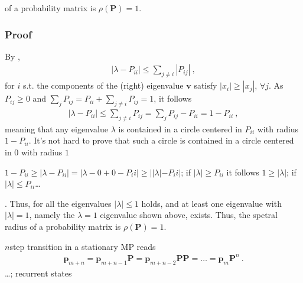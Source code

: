 \documentclass[letterpaper,10pt,english]{jupyterBook}
\begin{document}
\sphinxAtStartPar
{}

\sphinxAtStartPar
{\hyperref[\detokenize{ch/linear-algebra/matrix-factorization:math-matrix-factorization-ev-spectral-radius}]{}} of a probability matrix is \(\rho(\mathbf{P}) = 1\).
\subsubsection*{Proof}

\sphinxAtStartPar
By {\hyperref[\detokenize{ch/linear-algebra/matrix-factorization:math-matrix-factorization-ev-gershgorin}]{}},
\begin{equation*}
\begin{split}| \lambda - P_{ii} | \le \sum_{j \ne i} |P_{ij}| \ ,\end{split}
\end{equation*}
\sphinxAtStartPar
for \(i\) s.t. the components of the (right) eigenvalue \(\mathbf{v}\) satisfy \(|x_i| \ge |x_j|\), \(\forall j\). As \(P_{ij} \ge 0\) and \(\sum_j P_{ij} = P_{ii} + \sum_{j \ne i} P_{ij} = 1\), it follows
\begin{equation*}
\begin{split}|\lambda - P_{ii}| \le \sum_{j \ne i} P_{ij} = \sum_{j} P_{ij} - P_{ii} = 1 - P_{ii} \ ,\end{split}
\end{equation*}
\sphinxAtStartPar
meaning that any eigenvalue \(\lambda\) is contained in a circle centered in \(P_{ii}\) with radius \(1 - P_{ii}\). It’s not hard to prove that such a circle is contained in a circle centered in \(0\) with radius \(1\)%
\begin{footnote}[1]\sphinxAtStartFootnote
\(1 - P_{ii} \ge |\lambda - P_{ii}| = |\lambda - 0 + 0 - P_ii| \ge | |\lambda| - P_ii |\); if \(|\lambda| \ge P_{ii}\) it follows \(1 \ge |\lambda|\); if \(|\lambda| \le P_{ii}\)…
%
\end{footnote}. Thus, for all the eigenvalues \(|\lambda| \le 1\) holds, and at least one eigenvalue with \(|\lambda| = 1\), namely the \(\lambda = 1\) eigenvalue shown above, exists. Thus, the spetral radius of a probability matrix is \(\rho(\mathbf{P}) = 1\).

\sphinxAtStartPar
{} \(n\)\sphinxhyphen{}step transition in a stationary MP reads
\begin{equation*}
\begin{split}\mathbf{p}_{m+n} = \mathbf{p}_{m+n-1} \mathbf{P} = \mathbf{p}_{m+n-2} \mathbf{P} \mathbf{P} = \dots =  \mathbf{p}_m \mathbf{P}^n \ .\end{split}
\end{equation*}
\sphinxAtStartPar
{} …; recurrent states
\end{document}
